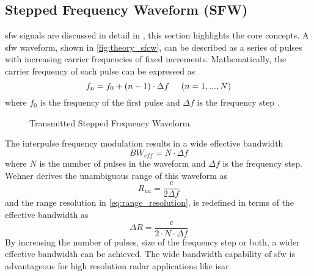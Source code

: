 \documentclass[class=report,11pt,crop=false]{standalone}
\begin{document}
    \subsection{Stepped Frequency Waveform (SFW)\label{subsec:theory_sfw}}
     \gls{sfw} signals are discussed in detail in \cite{ISARtextbook_Martorella,ISARtextbook_Matlab,Wehner1995}, this section highlights the core concepts. 
     A \gls{sfw} waveform, shown in \autoref{fig:theory_sfcw}, can be described as a series of pulses with increasing carrier frequencies of fixed increments. Mathematically, the carrier frequency of each pulse can be expressed as
    \begin{equation} \label{eq:frequencies_sfw}
        f_n = f_0 + (n-1) \cdot \Delta f \hspace{0.5cm} (n = 1,..., N)
    \end{equation}
    where $f_0$ is the frequency of the first pulse and $\Delta f$ is the frequency step \cite{ISARtextbook_Martorella}.  
    
    \begin{figure}
        \centering
        \resizebox{1\linewidth}{!}{}
        \caption{Transmitted Stepped Frequency Waveform.\label{fig:theory_sfcw}}
    \end{figure}
    The interpulse frequency modulation results in a wide effective bandwidth
    \begin{equation} \label{eq:bw_sfw}
        BW_{eff} = N \cdot \Delta f
    \end{equation}
    where \(N\) is the number of pulses in the waveform and \(\Delta f\) is the frequency step. Wehner \cite{Wehner1995} derives the unambiguous range of this waveform as
    \begin{equation} \label{eq:range_unambiguous_sfw}
        R_{ua} = \frac{c}{2\Delta f}
    \end{equation}
    and the range resolution in \autoref{eq:range_resolution}, is redefined in terms of the effective bandwidth as
    \begin{equation}  \label{eq:range_resolution_sfw}
        \Delta R = \frac{c}{2 \cdot N \cdot \Delta f}
    \end{equation}
    By increasing the number of pulses, size of the frequency step or both, a wider effective bandwidth can be achieved. The wide bandwidth capability of \gls{sfw} is advantageous for high resolution radar applications like \gls{isar}.
    
\end{document}
